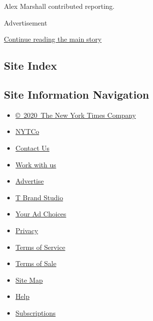 Alex Marshall contributed reporting.

Advertisement

\protect\hyperlink{after-bottom}{Continue reading the main story}

\hypertarget{site-index}{%
\subsection{Site Index}\label{site-index}}

\hypertarget{site-information-navigation}{%
\subsection{Site Information
Navigation}\label{site-information-navigation}}

\begin{itemize}
\tightlist
\item
  \href{https://help.nytimes3xbfgragh.onion/hc/en-us/articles/115014792127-Copyright-notice}{©~2020~The
  New York Times Company}
\end{itemize}

\begin{itemize}
\tightlist
\item
  \href{https://www.nytco.com/}{NYTCo}
\item
  \href{https://help.nytimes3xbfgragh.onion/hc/en-us/articles/115015385887-Contact-Us}{Contact
  Us}
\item
  \href{https://www.nytco.com/careers/}{Work with us}
\item
  \href{https://nytmediakit.com/}{Advertise}
\item
  \href{http://www.tbrandstudio.com/}{T Brand Studio}
\item
  \href{https://www.nytimes3xbfgragh.onion/privacy/cookie-policy\#how-do-i-manage-trackers}{Your
  Ad Choices}
\item
  \href{https://www.nytimes3xbfgragh.onion/privacy}{Privacy}
\item
  \href{https://help.nytimes3xbfgragh.onion/hc/en-us/articles/115014893428-Terms-of-service}{Terms
  of Service}
\item
  \href{https://help.nytimes3xbfgragh.onion/hc/en-us/articles/115014893968-Terms-of-sale}{Terms
  of Sale}
\item
  \href{https://spiderbites.nytimes3xbfgragh.onion}{Site Map}
\item
  \href{https://help.nytimes3xbfgragh.onion/hc/en-us}{Help}
\item
  \href{https://www.nytimes3xbfgragh.onion/subscription?campaignId=37WXW}{Subscriptions}
\end{itemize}

